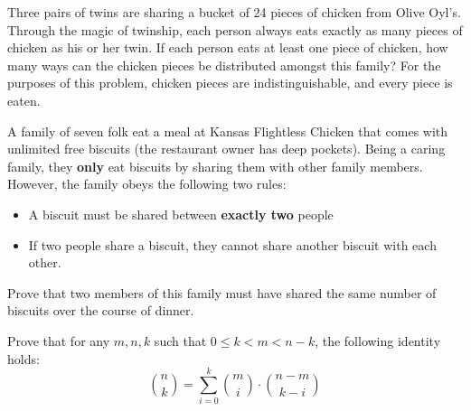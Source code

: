 \documentclass[12pt,oneside]{article}
\begin{document}
\newpage
\begin{problem}{10}
Three pairs of twins are sharing a bucket of 24 pieces of chicken from Olive Oyl's.  Through the magic of twinship, each person always eats exactly as many pieces of chicken as his or her twin.  If each person eats at least one piece of chicken, how many ways can the chicken pieces be distributed amongst this family?  For the purposes of this problem, chicken pieces are indistinguishable, and every piece is eaten.  
\end{problem}
\newpage

\begin{problem}{15}
A family of seven folk eat a meal at Kansas Flightless Chicken that comes with unlimited free biscuits (the restaurant owner has deep pockets).  Being a caring family, they \textbf{only} eat biscuits by sharing them with other family members.  However, the family obeys the following two rules:

\begin{itemize}
	\item A biscuit must be shared between \textbf{exactly two} people
	\item If two people share a biscuit, they cannot share another biscuit with each other.  
\end{itemize}

Prove that two members of this family must have shared the same number of biscuits over the course of dinner.

\end{problem}

\newpage


\begin{problem}{10}
Prove that for any $m,n,k$ such that $0 \leq k < m<n-k$, the following identity holds:
\[ \binom{n}{k} = \sum_{i=0}^{k} {\binom{m}{i}} \cdot {\binom{n-m}{k-i}}\]
\end{problem}

\newpage
\end{document}

